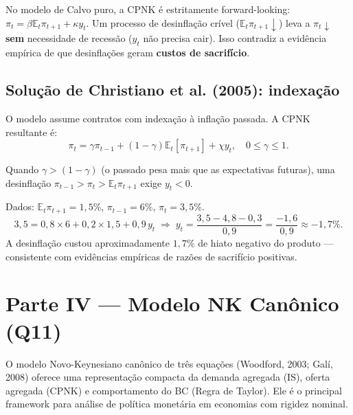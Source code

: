 \documentclass[12pt, a4paper]{article}
\newcommand{\E}{\mathbb{E}}
\begin{document}
No modelo de Calvo puro, a CPNK é estritamente forward-looking:
$\pi_t = \beta\E_t\pi_{t+1} + \kappa y_t$.
Um processo de desinflação crível ($\E_t\pi_{t+1} \downarrow$) leva a
$\pi_t \downarrow$ \textbf{sem} necessidade de recessão ($y_t$ não precisa cair).
Isso contradiz a evidência empírica de que desinflações geram \textbf{custos de sacrifício}.

\subsection*{Solução de Christiano et al. (2005): indexação}

O modelo assume contratos com indexação à inflação passada. A CPNK resultante é:
\begin{equation}
\pi_t = \gamma\pi_{t-1} + (1-\gamma)\E_t[\pi_{t+1}] + \chi y_t, \quad 0 \leq \gamma \leq 1.
\end{equation}

\begin{resultbox}[title={Mecanismo de geração de custos de desinflação}]
Quando $\gamma > (1-\gamma)$ (o passado pesa mais que as expectativas futuras), uma
desinflação $\pi_{t-1} > \pi_t > \E_t\pi_{t+1}$ exige $y_t < 0$.
\end{resultbox}

\begin{provabox}[title={Exemplo numérico ($\gamma=0{,}8$, $\chi=0{,}9$)}]
Dados: $\E_t\pi_{t+1} = 1{,}5\%$, $\pi_{t-1} = 6\%$, $\pi_t = 3{,}5\%$.
\[
3{,}5 = 0{,}8 \times 6 + 0{,}2 \times 1{,}5 + 0{,}9\,y_t
\;\Rightarrow\;
y_t = \frac{3{,}5 - 4{,}8 - 0{,}3}{0{,}9} = \frac{-1{,}6}{0{,}9} \approx -1{,}7\%.
\]
A desinflação custou aproximadamente $1{,}7\%$ de hiato negativo do produto ---
consistente com evidências empíricas de razões de sacrifício positivas.
\end{provabox}


\newpage
\section*{\large\color{cyanrbc} Parte IV --- Modelo NK Canônico (Q11)}

O modelo Novo-Keynesiano canônico de três equações (Woodford, 2003; Galí, 2008)
oferece uma representação compacta da demanda agregada (IS), oferta agregada (CPNK)
e comportamento do BC (Regra de Taylor). Ele é o principal framework para análise
de política monetária em economias com rigidez nominal.
\end{document}
